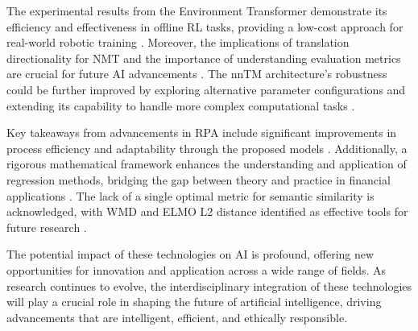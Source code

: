 The experimental results from the Environment Transformer demonstrate its efficiency and effectiveness in offline RL tasks, providing a low-cost approach for real-world robotic training \cite{wang2023environmenttransformerpolicyoptimization}. Moreover, the implications of translation directionality for NMT and the importance of understanding evaluation metrics are crucial for future AI advancements \cite{bogoychev2020domaintranslationesenoisesynthetic}. The nnTM architecture's robustness could be further improved by exploring alternative parameter configurations and extending its capability to handle more complex computational tasks \cite{stogin2022provablystableneuralnetwork}.



Key takeaways from advancements in RPA include significant improvements in process efficiency and adaptability through the proposed models \cite{pandy2024advancementsroboticsprocessautomation}. Additionally, a rigorous mathematical framework enhances the understanding and application of regression methods, bridging the gap between theory and practice in financial applications \cite{kun2022mathematicalfoundationsregressionmethods}. The lack of a single optimal metric for semantic similarity is acknowledged, with WMD and ELMO L2 distance identified as effective tools for future research \cite{yamshchikov2020styletransferparaphraselookingsensible}.



The potential impact of these technologies on AI is profound, offering new opportunities for innovation and application across a wide range of fields. As research continues to evolve, the interdisciplinary integration of these technologies will play a crucial role in shaping the future of artificial intelligence, driving advancements that are intelligent, efficient, and ethically responsible.